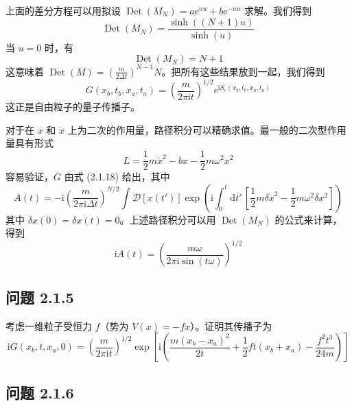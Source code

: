 
上面的差分方程可以用拟设 $\operatorname{Det}(M_N)=a\mathrm{e}^{nu}+b\mathrm{e}^{-nu}$ 求解。我们得到
\begin{equation*}
\operatorname{Det}(M_N)=\frac{\sinh((N+1)u)}{\sinh(u)}
\end{equation*}
当 $u=0$ 时，有
\begin{equation*}
\operatorname{Det}(M_N)=N+1
\end{equation*}
这意味着 $\operatorname{Det}(M)=\left(\frac{m}{2\Delta t}\right)^{N-1}N$。把所有这些结果放到一起，我们得到
\begin{equation*}
G(x_b,t_b,x_a,t_a)=\left(\frac{m}{2\pi\mathrm{i}t}\right)^{1/2}\mathrm{e}^{\mathrm{i}S_c(x_b,t_b,x_a,t_a)}
\end{equation*}
这正是自由粒子的量子传播子。

对于在 $x$ 和 $\dot{x}$ 上为二次的作用量，路径积分可以精确求值。最一般的二次型作用量具有形式
\begin{equation*}
L=\frac{1}{2}m\dot{x}^2-bx-\frac{1}{2}m\omega^2x^2
\end{equation*}
容易验证，$G$ 由式 (2.1.18) 给出，其中
\begin{equation*}
A(t)=-\mathrm{i}\left(\frac{m}{2\pi\mathrm{i}\Delta t}\right)^{N/2}\int \mathcal{D}[x(t')]\exp\left(\mathrm{i}\int_0^t\mathrm{d}t'\,\left[\frac{1}{2}m\delta\dot{x}^2-\frac{1}{2}m\omega^2\delta x^2\right]\right)
\end{equation*}
其中 $\delta x(0)=\delta x(t)=0$。上述路径积分可以用 $\operatorname{Det}(M_N)$ 的公式来计算，得到
\begin{equation*}
\mathrm{i}A(t)=\left(\frac{m\omega}{2\pi\mathrm{i}\sin(t\omega)}\right)^{1/2}\tag{2.1.19}
\end{equation*}

\subsection*{问题 2.1.5}

考虑一维粒子受恒力 $f$（势为 $V(x)=-fx$）。证明其传播子为
\begin{equation*}
\mathrm{i}G(x_b,t,x_a,0)=\left(\frac{m}{2\pi\mathrm{i}t}\right)^{1/2}\exp\left[\mathrm{i}\left(\frac{m(x_b-x_a)^2}{2t}+\frac{1}{2}ft(x_b+x_a)-\frac{f^2t^3}{24m}\right)\right]
\end{equation*}

\subsection*{问题 2.1.6}

